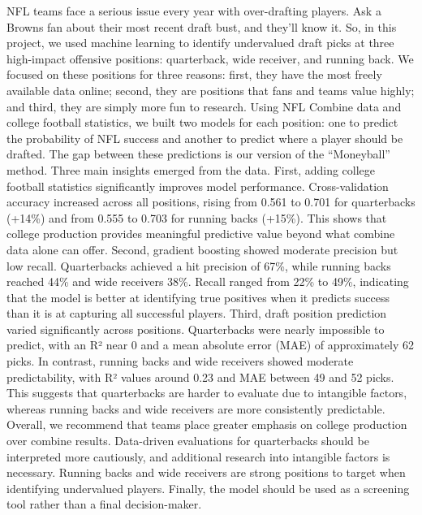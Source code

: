 \documentclass[11pt]{article}
\begin{document}
NFL teams face a serious issue every year with over-drafting players. Ask a Browns fan about their most recent draft bust, and they’ll know it. So, in this project, we used machine learning to identify undervalued draft picks at three high-impact offensive positions: quarterback, wide receiver, and running back. We focused on these positions for three reasons: first, they have the most freely available data online; second, they are positions that fans and teams value highly; and third, they are simply more fun to research. Using NFL Combine data and college football statistics, we built two models for each position: one to predict the probability of NFL success and another to predict where a player should be drafted. The gap between these predictions is our version of the “Moneyball” method. Three main insights emerged from the data. First, adding college football statistics significantly improves model performance. Cross-validation accuracy increased across all positions, rising from 0.561 to 0.701 for quarterbacks (+14\%) and from 0.555 to 0.703 for running backs (+15\%). This shows that college production provides meaningful predictive value beyond what combine data alone can offer. Second, gradient boosting showed moderate precision but low recall. Quarterbacks achieved a hit precision of 67\%, while running backs reached 44\% and wide receivers 38\%. Recall ranged from 22\% to 49\%, indicating that the model is better at identifying true positives when it predicts success than it is at capturing all successful players. Third, draft position prediction varied significantly across positions. Quarterbacks were nearly impossible to predict, with an R² near 0 and a mean absolute error (MAE) of approximately 62 picks. In contrast, running backs and wide receivers showed moderate predictability, with R² values around 0.23 and MAE between 49 and 52 picks. This suggests that quarterbacks are harder to evaluate due to intangible factors, whereas running backs and wide receivers are more consistently predictable. Overall, we recommend that teams place greater emphasis on college production over combine results. Data-driven evaluations for quarterbacks should be interpreted more cautiously, and additional research into intangible factors is necessary. Running backs and wide receivers are strong positions to target when identifying undervalued players. Finally, the model should be used as a screening tool rather than a final decision-maker.
\\

\end{document}
